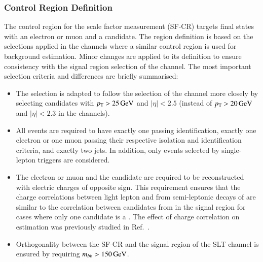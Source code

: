 \subsubsection{Control Region Definition}


The control region for the scale factor measurement (SF-CR) targets
final states with an electron or muon and a \tauhadvis candidate. The
region definition is based on the selections applied in the \lephad
channels where a similar control region is used for \faketauhadvis
background estimation. Minor changes are applied to its definition to
ensure consistency with the signal region selection of the \hadhad
channel. The most important selection criteria and differences are
briefly summarised:
\begin{itemize}

\item The \tauhadvis selection is adapted to follow the selection of
  the \hadhad channel more closely by selecting candidates with
  $p_{\text{T}} > \SI{25}{\ensuremath{\text{GeV}}}$ and $|\eta| < \num{2.5}$ (instead of
  $\pT > \SI{20}{\GeV}$ and $|\eta| < \num{2.3}$ in the \lephad
  channels).

\item All events are required to have exactly one \tauhadvis passing
  identification, exactly one electron or one muon passing their
  respective isolation and identification criteria, and exactly two
  \btagged jets. In addition, only events selected by single-lepton
  triggers are considered.

\item The electron or muon and the \tauhadvis candidate are required
  to be reconstructed with electric charges of opposite sign. This
  requirement ensures that the charge correlations between light
  lepton and \faketauhadvis from semi-leptonic decays of \ttbar are
  similar to the correlation between \tauhadvis candidates from
  \ttbarFakes in the \hadhad signal region for cases where only one
  candidate is a \faketauhadvis. The effect of charge correlation on
  \ttbarFakes estimation was previously studied in Ref.~\cite{bokan}.

\item Orthogonality between the SF-CR and the signal region of the
  \lephad SLT channel is ensured by requiring $m_{bb} > \SI{150}{\ensuremath{\text{GeV}}}$.

\end{itemize}

